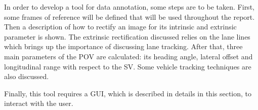 In order to develop a tool for data annotation, some steps are to be taken. First, some frames of reference will be defined that will be used throughout the report. Then a description of how to rectify an image for its intrinsic and extrinsic parameter is shown. The extrinsic rectification discussed relies on the lane lines which brings up the importance of discussing lane tracking. After that, three main parameters of the POV are calculated: its heading angle, lateral offset and longitudinal range with respect to the SV. Some vehicle tracking techniques are also discussed.

Finally, this tool requires a GUI, which is described in details in this section, to interact with the user.